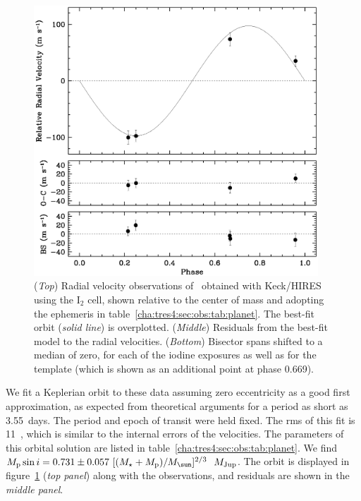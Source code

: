 \begin{figure}
\includegraphics[width=0.95\textwidth]{A_TrES4_f2}
\caption[Keck/HIRES radial velocity observations of \tresFour]{({\em Top}) Radial velocity observations of \tresFour\ obtained with 
Keck/HIRES using the I$_2$ cell, shown relative to the center of mass and 
adopting the ephemeris in table~\ref{cha:tres4:sec:obs:tab:planet}. The best-fit orbit 
({\em solid line}) is overplotted. ({\em Middle}) Residuals from the best-fit 
model to the radial velocities. ({\em Bottom}) Bisector spans shifted to a 
median of zero, for each of the iodine exposures as well as for the template 
(which is shown as an additional point at phase 0.669). \label{cha:tres4:sec:obs:fig:rv}}
\end{figure}

We fit a Keplerian orbit to these data assuming zero eccentricity as a good 
first approximation, as expected from theoretical arguments for a period as 
short as 3.55~days. The period and epoch of transit were held fixed. The rms of 
this fit is 11~\ms, which is similar to the internal errors of the velocities. 
The parameters of this orbital solution are listed in table~\ref{cha:tres4:sec:obs:tab:planet}. We 
find \mbox{$M_{\rm p} \sin i = 0.731 \pm 0.057~[(M_{\star} + M_{\rm p})/M_{\sun}]^{2/3}$~$M_{\rm Jup}$}. 
The orbit is displayed in figure~\ref{cha:tres4:sec:obs:fig:rv} ({\it top panel}) along with the 
observations, and residuals are shown in the {\it middle panel}.

